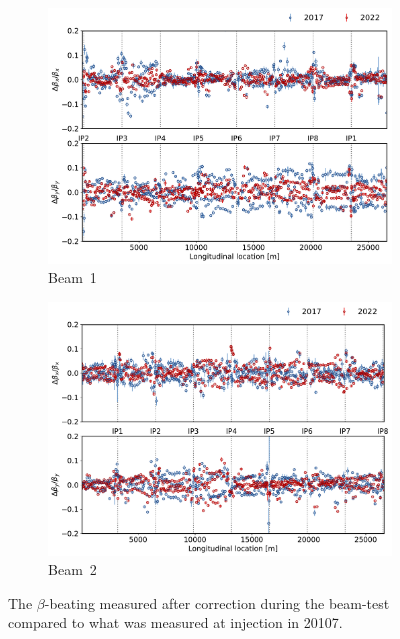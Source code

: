 \documentclass[a4paper]{cernatsnote}
\begin{document}
\begin{figure}[ht]
\begin{subfigure}{.5\textwidth}
  \centering
  \includegraphics[width=.99\linewidth]{plots/beam1/after_corr_2017_vs_2021.pdf}  
  \caption{Beam~1}
\end{subfigure}
\begin{subfigure}{.5\textwidth}
  \centering
  \includegraphics[width=.99\linewidth]{plots/beam2/after_corr_2017_vs_2021_beam2.pdf}  
  \caption{Beam~2}
\end{subfigure}
\caption{The $\beta$-beating measured after correction during the beam-test compared to what was measured at injection in 20107.}
\label{fig:2017_beta_beat_vs_2021}
\end{figure}
\end{document}
